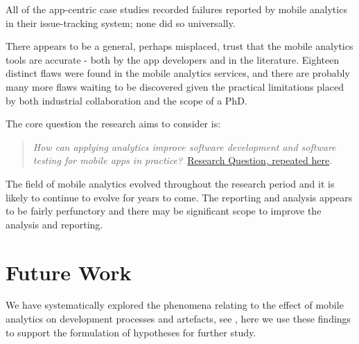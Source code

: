 All of the app-centric case studies recorded failures reported by mobile analytics in their issue-tracking system; none did so universally.



There appears to be a general, perhaps misplaced, trust that the mobile analytics tools are accurate - both by the app developers and in the literature. Eighteen distinct flaws were found in the mobile analytics services, and there are probably many more flaws waiting to be discovered given the practical limitations placed by both industrial collaboration and the scope of a PhD. 





The core question the research aims to consider is:
\begin{quote}
  \emph{How can applying analytics improve software development and software testing for mobile apps in practice?}~\href{overall-research-question}{Research Question, repeated here}.
\end{quote}






The field of mobile analytics evolved throughout the research period and it is likely to continue to evolve for years to come. The reporting and analysis appears to be fairly perfunctory and there may be significant scope to improve the analysis and reporting.




\clearpage
\section{Future Work}
We have systematically explored the phenomena relating to the effect of mobile analytics on development processes and artefacts, see , here we use these findings to support the formulation of hypotheses for further study. %


